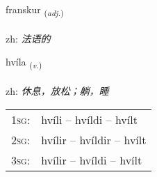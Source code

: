 \documentclass[frontgrid, backgrid]{flacards}\usepackage[]{graphicx}\usepackage[]{color}
\begin{document}
\renewcommand{\flhead}{\vskip5pt \fboxsep=0pt {\small\bfseries\footnotesize Lýsingarorð | 形容词}}
\renewcommand{\fcfoot}{\vskip5pt \fboxsep=0pt \hspace{2pt}{\small\bfseries\footnotesize 2K}}

\renewcommand{\blhead}{\vskip5pt {\small\bfseries\footnotesize Lýsingarorð | 形容词 }}
\renewcommand{\bcfoot}{\vskip5pt \hspace{2pt}{\small\bfseries\footnotesize 2K}}


{franskur \small{\textsubscript{(\textit{adj.})}} \\[1ex] %
\textphonetic{[franskʏr]} \\
zh: \emph{法语的} \\  [2ex]
\renewcommand*{\arraystretch}{0.8}
}

\renewcommand{\flhead}{\vskip5pt \fboxsep=0pt {\small\bfseries\footnotesize Sagnorð | 动词}}
\renewcommand{\fcfoot}{\vskip5pt \fboxsep=0pt \hspace{2pt}{\small\bfseries\footnotesize 2K}}

\renewcommand{\blhead}{\vskip5pt {\small\bfseries\footnotesize Sagnorð | 动词 }}
\renewcommand{\bcfoot}{\vskip5pt \hspace{2pt}{\small\bfseries\footnotesize 2K}}


{hvíla \small{\textsubscript{(\textit{v.})}} \\[1ex] %
\textphonetic{[kʰviːla]} \\
zh: \emph{休息，放松；躺，睡} \\  [2ex]
\renewcommand*{\arraystretch}{0.8}
\begin{tabular}{p{1cm}l}
\textsc{1sg}: & hvíli -- hvíldi -- hvílt \\ 
\textsc{2sg}: & hvílir -- hvíldir -- hvílt \\ 
\textsc{3sg}: & hvílir -- hvíldi -- hvílt \\ 
\end{tabular}
}
\end{document}

